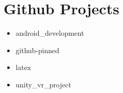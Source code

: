 \documentclass{article}%
\begin{document}
%
\normalsize%
\section{Github Projects}%
\label{sec:Github Projects}%
\begin{itemize}%
\item%
android\_development%
\item%
github{-}pinned%
\item%
latex%
\item%
unity\_vr\_project%
\end{itemize}

%
\end{document}
